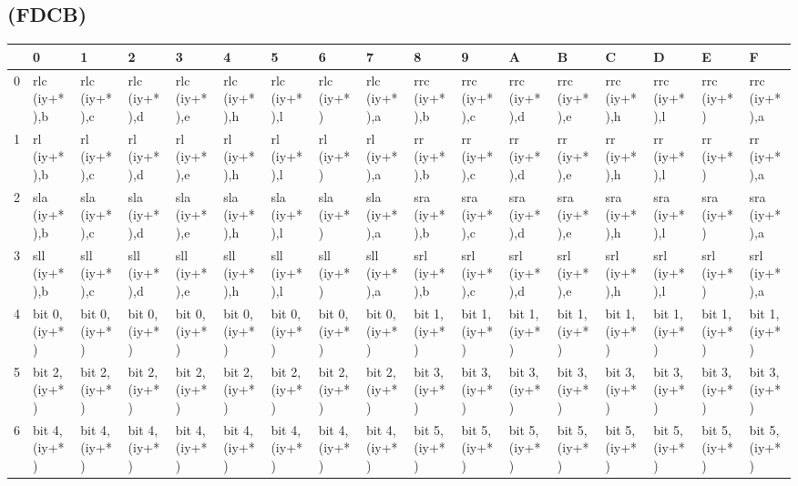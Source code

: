 \subsection{ (FDCB)}
\label{OPCFDCB}
\begin{ttfamily}
\begin{tiny}
\begin{tabularx}{1\textwidth}{l|X|X|X|X|X|X|X|X|X|X|X|X|X|X|X|X}
& 0 & 1 & 2 & 3 & 4 & 5 & 6 & 7 & 8 & 9 & A & B & C & D & E & F \\ \hline
0 & rlc (iy+*),b   & rlc (iy+*),c   & rlc (iy+*),d   & rlc (iy+*),e   & rlc (iy+*),h   & rlc (iy+*),l   & rlc (iy+*)   & rlc (iy+*),a   & rrc (iy+*),b   & rrc (iy+*),c   & rrc (iy+*),d   & rrc (iy+*),e & rrc (iy+*),h & rrc (iy+*),l & rrc (iy+*) & rrc (iy+*),a \\ \hline
1 & rl (iy+*),b    & rl (iy+*),c    & rl (iy+*),d    & rl (iy+*),e    & rl (iy+*),h    & rl (iy+*),l    & rl (iy+*)    & rl (iy+*),a    & rr (iy+*),b    & rr (iy+*),c    & rr (iy+*),d    & rr (iy+*),e & rr (iy+*),h & rr (iy+*),l & rr (iy+*) & rr (iy+*),a \\ \hline
2 & sla (iy+*),b   & sla (iy+*),c   & sla (iy+*),d   & sla (iy+*),e   & sla (iy+*),h   & sla (iy+*),l   & sla (iy+*)   & sla (iy+*),a   & sra (iy+*),b   & sra (iy+*),c   & sra (iy+*),d   & sra (iy+*),e & sra (iy+*),h & sra (iy+*),l & sra (iy+*) & sra (iy+*),a \\ \hline
3 & sll (iy+*),b   & sll (iy+*),c   & sll (iy+*),d   & sll (iy+*),e   & sll (iy+*),h   & sll (iy+*),l   & sll (iy+*)   & sll (iy+*),a   & srl (iy+*),b   & srl (iy+*),c   & srl (iy+*),d   & srl (iy+*),e & srl (iy+*),h & srl (iy+*),l & srl (iy+*) & srl (iy+*),a \\ \hline
4 & bit 0, (iy+*)   & bit 0, (iy+*)   & bit 0, (iy+*)   & bit 0, (iy+*)   & bit 0, (iy+*)   & bit 0, (iy+*)   & bit 0, (iy+*) & bit 0, (iy+*)   & bit 1, (iy+*)   & bit 1, (iy+*)   & bit 1, (iy+*)   & bit 1, (iy+*) & bit 1, (iy+*) & bit 1, (iy+*) & bit 1, (iy+*) & bit 1, (iy+*) \\ \hline
5 & bit 2, (iy+*)   & bit 2, (iy+*)   & bit 2, (iy+*)   & bit 2, (iy+*)   & bit 2, (iy+*)   & bit 2, (iy+*)   & bit 2, (iy+*) & bit 2, (iy+*)   & bit 3, (iy+*)   & bit 3, (iy+*)   & bit 3, (iy+*)   & bit 3, (iy+*) & bit 3, (iy+*) & bit 3, (iy+*) & bit 3, (iy+*) & bit 3, (iy+*) \\ \hline
6 & bit 4, (iy+*)   & bit 4, (iy+*)   & bit 4, (iy+*)   & bit 4, (iy+*)   & bit 4, (iy+*)   & bit 4, (iy+*)   & bit 4, (iy+*) & bit 4, (iy+*)   & bit 5, (iy+*)   & bit 5, (iy+*)   & bit 5, (iy+*)   & bit 5, (iy+*) & bit 5, (iy+*) & bit 5, (iy+*) & bit 5, (iy+*) & bit 5, (iy+*) \\ \hline

\end{tabularx}
\end{tiny}
\end{ttfamily}

